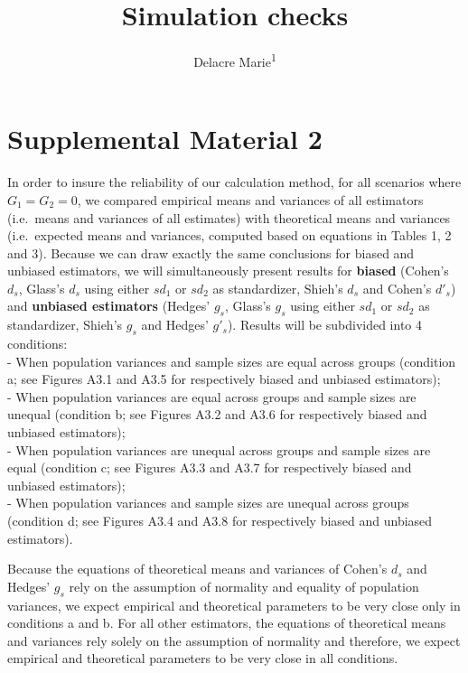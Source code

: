 \documentclass[
  man]{apa6}
\affiliation{
\vspace{0.5cm}
\textsuperscript{1} ULB}
\title{Simulation checks}
\author{Delacre Marie\textsuperscript{1}}
\date{}
\begin{document}
\maketitle

\hypertarget{supplemental-material-2}{%
\section{Supplemental Material 2}\label{supplemental-material-2}}

In order to insure the reliability of our calculation method, for all scenarios where \(G_1=G_2=0\), we compared empirical means and variances of all estimators (i.e.~means and variances of all estimates) with theoretical means and variances (i.e.~expected means and variances, computed based on equations in Tables 1, 2 and 3). Because we can draw exactly the same conclusions for biased and unbiased estimators, we will simultaneously present results for \textbf{biased} (Cohen's \(d_s\), Glass's \(d_s\) using either \(sd_1\) or \(sd_2\) as standardizer, Shieh's \(d_s\) and Cohen's \(d'_s\)) and \textbf{unbiased estimators} (Hedges' \(g_s\), Glass's \(g_s\) using either \(sd_1\) or \(sd_2\) as standardizer, Shieh's \(g_s\) and Hedges' \(g'_s\)). Results will be subdivided into 4 conditions:\\
- When population variances and sample sizes are equal across groups (condition a; see Figures A3.1 and A3.5 for respectively biased and unbiased estimators);\\
- When population variances are equal across groups and sample sizes are unequal (condition b; see Figures A3.2 and A3.6 for respectively biased and unbiased estimators);\\
- When population variances are unequal across groups and sample sizes are equal (condition c; see Figures A3.3 and A3.7 for respectively biased and unbiased estimators);\\
- When population variances and sample sizes are unequal across groups (condition d; see Figures A3.4 and A3.8 for respectively biased and unbiased estimators).

Because the equations of theoretical means and variances of Cohen's \(d_s\) and Hedges' \(g_s\) rely on the assumption of normality and equality of population variances, we expect empirical and theoretical parameters to be very close only in conditions a and b. For all other estimators, the equations of theoretical means and variances rely solely on the assumption of normality and therefore, we expect empirical and theoretical parameters to be very close in all conditions.
\end{document}
